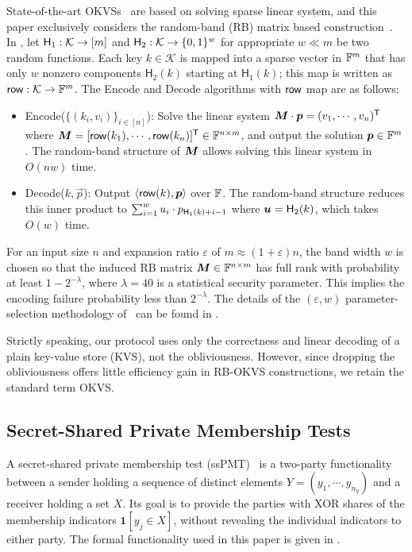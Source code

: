 State-of-the-art OKVSs~\cite{RR22,BPSY23} are based on solving sparse linear system, and this paper exclusively considers the random-band (RB) matrix based construction~\cite{BPSY23}. In \cite{BPSY23}, let ${\sf H}_1: \mathcal{K}\rightarrow [m]$ and ${\sf H}_2: \mathcal{K} \rightarrow \{0,1\}^w$ for appropriate $w \ll m$ be two random functions. Each key $k\in \mathcal{K}$ is mapped into a sparse vector in $\F^m$ that has only $w$ nonzero components $\mathsf{H}_2(k)$ starting at $\mathsf{H}_1(k)$; this map is written as ${\sf row}: \mathcal{K} \rightarrow \F^m$. The {\sf Encode} and {\sf Decode} algorithms with ${\sf row}$ map are as follows:
\begin{itemize}
\item {\sf Encode}($\{(k_i,v_i)\}_{i\in [n]}$): Solve the linear system $\mat M\cdot \vec p = (v_1, \cdots, v_n)^{\sf T}$ where $\mat M = [{\sf row}(k_1), \cdots, {\sf row}(k_n)]^{\sf T} \in \F^{n\times m}$, and output the solution $\vec p \in \F^m$. The random-band structure of $\mat M$ allows solving this linear system in $O(nw)$ time.
\item {\sf Decode}($k, \vec p$): Output $\langle {\sf row}(k), \vec p \rangle$ over $\F$. The random-band structure reduces this inner product to 
$ \sum_{i=1}^w u_i \cdot p_{{\sf H}_1(k) + i - 1} $ where $\vec u = {\sf H}_2(k)$, which takes $O(w)$ time.
\end{itemize}
For an input size $n$ and expansion ratio $\varepsilon$ of $m\approx(1+\varepsilon)n$, the band width $w$ is chosen so that the induced RB matrix $\mat M\in\F^{n\times m}$ has full rank with probability at least \(1-2^{-\lambda}\), where $\lambda = 40$ is a statistical security parameter. This implies the encoding failure probability less than $2^{-\lambda}$.
The details of the $(\varepsilon,w)$ parameter-selection methodology of~\cite{BPSY23} can be found in .

\begin{remark}
    Strictly speaking, our protocol uses only the correctness and linear decoding of a plain key-value store (KVS), not the obliviousness. However, since dropping the obliviousness offers little efficiency gain in RB-OKVS constructions, we retain the standard term OKVS.
\end{remark}


\subsection{Secret-Shared Private Membership Tests}
A secret-shared private membership test (ssPMT)~\cite{JSZG24} is a two-party functionality between a sender holding a sequence of distinct elements $Y=(y_1,\cdots,y_{n_y})$ and a receiver holding a set $X$. Its goal is to provide the parties with XOR shares of the membership indicators $\mathbf 1[y_j\in X]$, without revealing the individual
indicators to either party. The formal functionality used in this paper is given in .

